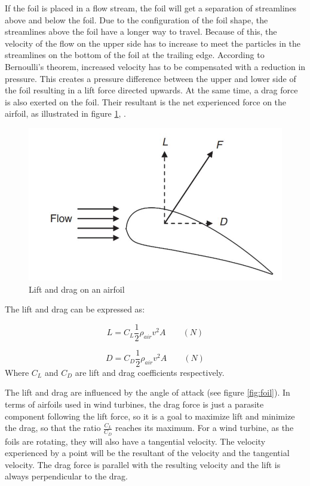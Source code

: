 \noindent If the foil is placed in a flow stream, the foil will get a separation of streamlines above and below the foil. Due to the configuration of the foil shape, the streamlines above the foil have a longer way to travel. Because of this, the velocity of the flow on the upper side has to increase to meet the particles in the streamlines on the bottom of the foil at the trailing edge. According to Bernoulli's theorem, increased velocity has to be compensated with a reduction in pressure. This creates a pressure difference between the upper and lower side of the foil resulting in a lift force directed upwards. At the same time, a drag force is also exerted on the foil. Their resultant is the net experienced force on the airfoil, as illustrated in figure \ref{fig:liftdrag}, \cite{MATHEW2012}. 

\begin{figure}[H]
\centering
\includegraphics[scale=0.6]{figures/liftdrag}
\caption[$\; \:$Lift and drag on an airfoil]{Lift and drag on an airfoil \cite{MATHEW2012} }
 \label{fig:liftdrag}
\end{figure}

 \noindent The lift and drag can be expressed as:

 \begin{equation}
    L = C_L\frac{1}{2}\rho_{air} v^2 A \qquad (N)
\end{equation}

\begin{equation}
    D = C_D\frac{1}{2}\rho_{air} v^2 A \qquad (N)
\end{equation}
Where $C_L$ and $C_D$ are lift and drag coefficients respectively.\newline 
\newline

\noindent The lift and drag are influenced by the angle of attack (see figure \ref{fig:foil}). In terms of airfoils used in wind turbines, the drag force is just a parasite component following the lift force, so it is a goal to maximize lift and minimize the drag, so that the ratio $\frac{C_L}{C_D}$ reaches its maximum. For a wind turbine, as the foils are rotating, they will also have a tangential velocity. The velocity experienced by a point will be the resultant of the velocity and the tangential velocity. The drag force is parallel with the resulting velocity and the lift is always perpendicular to the drag. 

